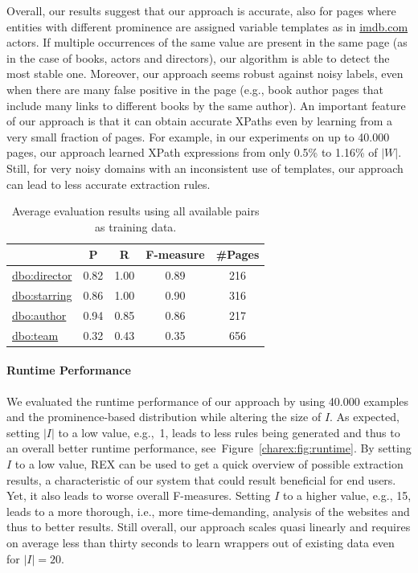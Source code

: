 Overall, our results suggest that our approach is accurate, also for pages where entities with different prominence are assigned variable templates as in \url{imdb.com} actors. 
If multiple occurrences of the same value are present in the same page (as in the case of books, actors and directors), our algorithm is able to detect the most stable one.
Moreover, our approach seems robust against noisy labels, even when there are many false positive in the page (e.g., book author pages that include many links to different books by the same author).
An important feature of our approach is that it can obtain accurate XPaths even by learning from a very small fraction of pages. 
For example, in our experiments on up to 40.000 pages, our approach learned XPath expressions from only 0.5\% to 1.16\% of $|W|$.
Still, for very noisy domains with an inconsistent use of templates, our approach can lead to less accurate extraction rules.
\begin{table}[htb]
\centering
\begin{tabular}{lcccc}
\toprule
  &  P & R & F-measure & \#Pages \\
\midrule
\url{dbo:director}  & 0.82 & 1.00 & 0.89 & 216\\
\url{dbo:starring}  & 0.86 & 1.00 & 0.90 & 316\\
\url{dbo:author}    & 0.94 & 0.85 & 0.86 & 217\\
\url{dbo:team}      & 0.32 & 0.43 & 0.35 & 656\\
\bottomrule
\end{tabular}
\caption{Average evaluation results using all available pairs as training data.} 
\label{tab:overall}
\end{table}

\paragraph{Runtime Performance}
We evaluated the runtime performance of our approach by using 40.000 examples and the prominence-based distribution while altering the size of $I$.
As expected, setting $|I|$ to a low value, e.g.,~1, leads to less rules being generated and thus to an overall better runtime performance, see~Figure~\ref{charex:fig:runtime}.
By setting $I$ to a low value, REX can be used to get a quick overview of possible extraction results, a
characteristic of our system that could result beneficial for end users.
Yet, it also leads to worse overall F-measures.
Setting $I$ to a higher value, e.g., 15, leads to a more thorough, i.e., more time-demanding, analysis of the websites and thus to better results. 
Still overall, our approach scales quasi linearly and requires on average less than thirty seconds to learn wrappers out of existing data even for $|I|=20$.

